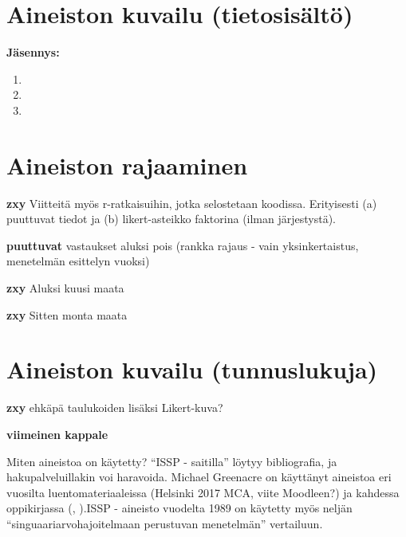 \documentclass[finnish,]{book}
\theoremstyle{definition}
\theoremstyle{definition}
\theoremstyle{definition}
\theoremstyle{remark}
\begin{document}
\hypertarget{aineiston-kuvailu-tietosisalto}{%
\section{Aineiston kuvailu
(tietosisältö)}\label{aineiston-kuvailu-tietosisalto}}

\textbf{Jäsennys:}

\begin{enumerate}
\def\labelenumi{\arabic{enumi}.}
\item
\item
\item
\end{enumerate}

\hypertarget{aineiston-rajaaminen}{%
\section{Aineiston rajaaminen}\label{aineiston-rajaaminen}}

\textbf{zxy} Viitteitä myös r-ratkaisuihin, jotka selostetaan koodissa.
Erityisesti (a) puuttuvat tiedot ja (b) likert-asteikko faktorina (ilman
järjestystä).

\textbf{puuttuvat} vastaukset aluksi pois (rankka rajaus - vain
yksinkertaistus, menetelmän esittelyn vuoksi)

\textbf{zxy} Aluksi kuusi maata

\textbf{zxy} Sitten monta maata

\hypertarget{aineiston-kuvailu-tunnuslukuja}{%
\section{Aineiston kuvailu
(tunnuslukuja)}\label{aineiston-kuvailu-tunnuslukuja}}

\textbf{zxy} ehkäpä taulukoiden lisäksi Likert-kuva?

\textbf{viimeinen kappale}

Miten aineistoa on käytetty? ``ISSP - saitilla'' löytyy bibliografia, ja
hakupalveluillakin voi haravoida. Michael Greenacre on käyttänyt
aineistoa eri vuosilta luentomateriaaleissa (Helsinki 2017 MCA, viite
Moodleen?) ja kahdessa oppikirjassa
(\citep{RefWorks:doc:5a857a43e4b0ed2d44664d7c},
\citep{RefWorks:doc:5a857a43e4b0ed2d44664d78}).ISSP - aineisto vuodelta
1989 on käytetty myös neljän ``singuaariarvohajoitelmaan perustuvan
menetelmän'' vertailuun\citep{RefWorks:doc:5b6f159ce4b0bc0f31734b76}.
\end{document}
